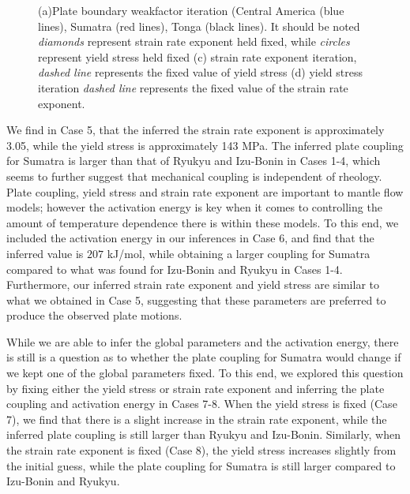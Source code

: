 \documentclass[12pt]{article}
\begin{document}
\begin{figure}[H]
{}
\caption{(a)Plate boundary weakfactor iteration (Central America (blue lines), Sumatra (red lines), Tonga (black lines). It should be noted \textit{diamonds} represent strain rate exponent held fixed, while \textit{circles} represent yield stress held fixed (c) strain rate exponent iteration, \textit{dashed line} represents the fixed value of yield stress (d) yield stress iteration \textit{dashed line} represents the fixed value of the strain rate exponent.}
\label{fig:inverse1}
\end{figure}
We find in Case 5, that the inferred the strain rate exponent is approximately 3.05, while the yield stress is approximately 143 MPa. The inferred plate coupling for Sumatra is larger than that of Ryukyu and Izu-Bonin in Cases 1-4, which seems to further suggest that mechanical coupling is independent of rheology. Plate coupling, yield stress and strain rate exponent are important to mantle flow models; however the activation energy is key when it comes to controlling the amount of temperature dependence there is within these models. To this end, we included the activation energy in our inferences in Case 6, and find that the inferred value is $207$ kJ/mol, while obtaining a larger coupling for Sumatra compared to what was found for Izu-Bonin and Ryukyu in  Cases 1-4. Furthermore, our inferred strain rate exponent and yield stress are similar to what we obtained in Case 5, suggesting that these parameters are preferred to produce the observed plate motions. 


While we are able to infer the global parameters and the activation energy, there is still is a question as to whether the plate coupling for Sumatra would change if we kept one of the global parameters fixed. To this end, we explored this question by fixing either the yield stress or strain rate exponent and inferring the plate coupling and activation energy in Cases 7-8. When the yield stress is fixed (Case 7), we find that there is a slight increase in the strain rate exponent, while the inferred plate coupling is still larger than Ryukyu and Izu-Bonin. Similarly, when the strain rate exponent is fixed (Case 8), the yield stress increases slightly from the initial guess, while the plate coupling for Sumatra is still larger compared to Izu-Bonin and Ryukyu. 
\end{document}
